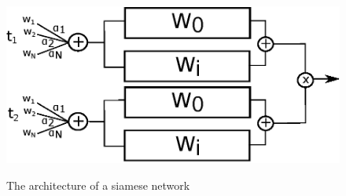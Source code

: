 \documentclass[letterpaper]{article}
\begin{document}
\begin{figure}
\centering
\includegraphics[width=0.7\linewidth]{figures/siamese_1}
\label{fig:siamese_1}
\caption{The architecture of a siamese network}
\end{figure}



\end{document}
